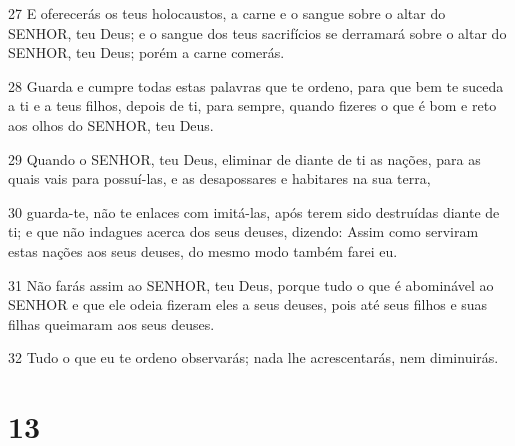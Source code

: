 \par 27 E oferecerás os teus holocaustos, a carne e o sangue sobre o altar do SENHOR, teu Deus; e o sangue dos teus sacrifícios se derramará sobre o altar do SENHOR, teu Deus; porém a carne comerás.
\par 28 Guarda e cumpre todas estas palavras que te ordeno, para que bem te suceda a ti e a teus filhos, depois de ti, para sempre, quando fizeres o que é bom e reto aos olhos do SENHOR, teu Deus.
\par 29 Quando o SENHOR, teu Deus, eliminar de diante de ti as nações, para as quais vais para possuí-las, e as desapossares e habitares na sua terra,
\par 30 guarda-te, não te enlaces com imitá-las, após terem sido destruídas diante de ti; e que não indagues acerca dos seus deuses, dizendo: Assim como serviram estas nações aos seus deuses, do mesmo modo também farei eu.
\par 31 Não farás assim ao SENHOR, teu Deus, porque tudo o que é abominável ao SENHOR e que ele odeia fizeram eles a seus deuses, pois até seus filhos e suas filhas queimaram aos seus deuses.
\par 32 Tudo o que eu te ordeno observarás; nada lhe acrescentarás, nem diminuirás.

\chapter{13}

